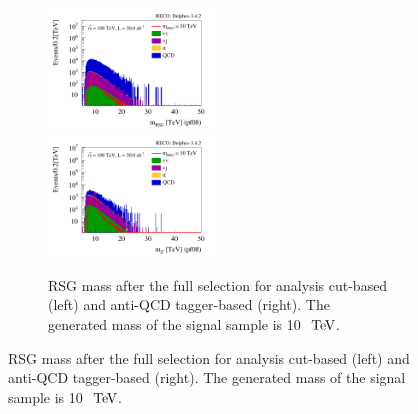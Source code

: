 \documentclass{cernrep}
\begin{document}
\begin{figure}[!htb]
\begin{figure}[!htb]\centering
\includegraphics[width=0.495\textwidth]{Fig/RSGww/cut/Mj1j2_pf08_sel2_nostack_log.png}
\includegraphics[width=0.495\textwidth]{Fig/RSGww/tagger/Mj1j2_pf08_sel2_nostack_log.png}
\caption{RSG mass after the full selection for analysis cut-based (left) and anti-QCD tagger-based (right). The generated mass of the signal sample is 10 $\TeV$.}
\label{fig:RSGww_mass_sel_final}
\end{figure}


\end{figure}
\end{document}
